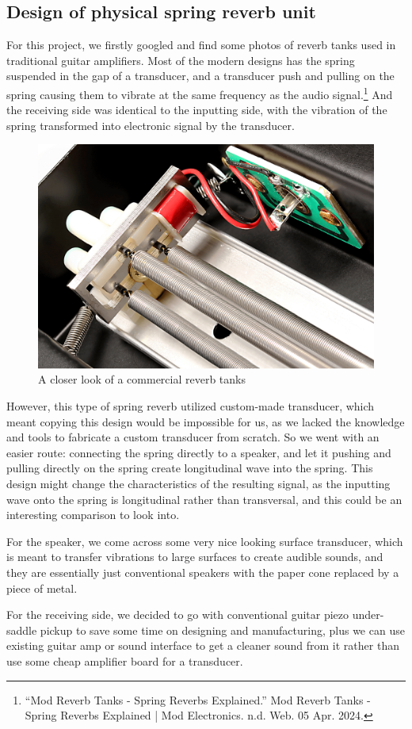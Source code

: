 \documentclass[12pt]{article}
\begin{document}
\subsection{Design of physical spring reverb unit}

For this project, we firstly googled and find some photos of reverb tanks used in traditional guitar amplifiers. Most of the modern designs has the spring suspended in the gap of a transducer, and a transducer push and pulling on the spring causing them to vibrate at the same frequency as the audio signal.\footnote{``Mod Reverb Tanks - Spring Reverbs Explained.'' Mod Reverb Tanks - Spring Reverbs Explained | Mod Electronics. n.d. Web. 05 Apr. 2024. } And the receiving side was identical to the inputting side, with the vibration of the spring transformed into electronic signal by the transducer.

\begin{figure}[h]
	\center
	\includegraphics[width=0.3\linewidth]{small_tank_out_detail.png}
	\caption{A closer look of a commercial reverb tanks}
\end{figure}

However, this type of spring reverb utilized custom-made transducer, which meant copying this design would be impossible for us, as we lacked the knowledge and tools to fabricate a custom transducer from scratch. So we went with an easier route: connecting the spring directly to a speaker, and let it pushing and pulling directly on the spring create longitudinal wave into the spring. This design might change the characteristics of the resulting signal, as the inputting wave onto the spring is longitudinal rather than transversal, and this could be an interesting comparison to look into.

For the speaker, we come across some very nice looking surface transducer, which is meant to transfer vibrations to large surfaces to create audible sounds, and they are essentially just conventional speakers with the paper cone replaced by a piece of metal.

For the receiving side, we decided to go with conventional guitar piezo under-saddle pickup to save some time on designing and manufacturing, plus we can use existing guitar amp or sound interface to get a cleaner sound from it rather than use some cheap amplifier board for a transducer.
\end{document}
